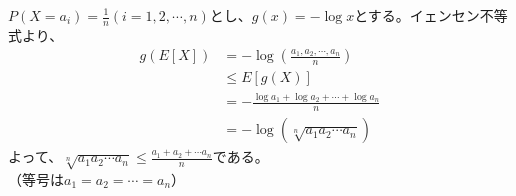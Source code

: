 \documentclass[a4j,uplatex,dvipdfmx]{jsarticle}
\begin{document}
$\displaystyle P(X=a_i)=\frac{1}{n}(i=1,2,\cdots,n)$とし、$g(x)=-\log{x}$とする。イェンセン不等式より、
\begin{equation}
  \begin{split}
    g(E[X]) &= -\log{ \left( \frac{a_1,a_2,\cdots , a_n}{n} \right)} \\
    & \le E[g(X)] \\
    &= -\frac{\log{a_1}+\log{a_2}+\cdots + \log{a_n}}{n}\\
    &= -\log(\sqrt[n]{a_1 a_2 \cdots a_n})
  \end{split}
\end{equation}
よって、$\displaystyle \sqrt[n]{a_1 a_2 \cdots a_n} \le \frac{a_1 + a_2 + \cdots a_n}{n}$である。\\
（等号は$a_1=a_2=\cdots = a_n$）
\end{document}
